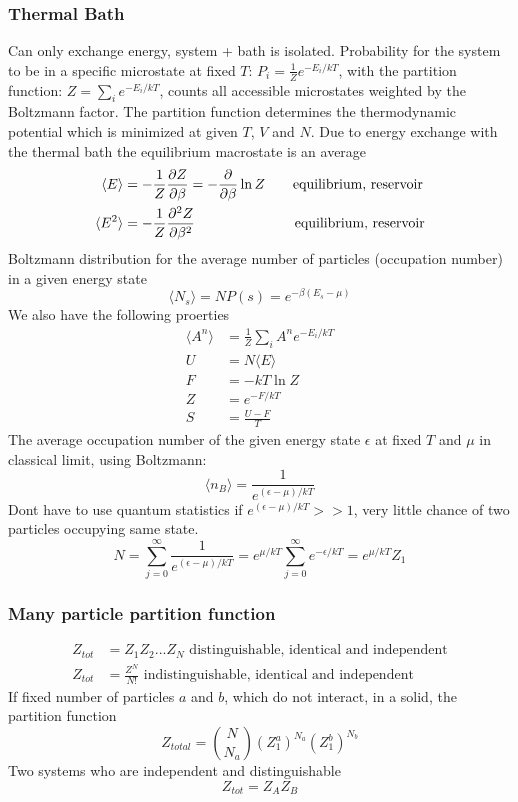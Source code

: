 \documentclass[a4paper, norsk, 8pt]{article}
\begin{document}
\begin{multicols*}{3}
\subsubsection*{\scriptsize Thermal Bath}
Can only exchange energy, system + bath is isolated. Probability for the system to be in a specific microstate at fixed $T$: $P_i = \frac{1}{Z}e^{-E_i/kT}$, with the partition function: $Z = \sum_{i} e^{-E_i/kT}$, counts all accessible microstates weighted by the Boltzmann factor. The partition function determines the thermodynamic potential which is minimized at given $T$, $V$ and $N$. Due to energy exchange with the thermal bath the equilibrium macrostate is an average
\begin{align*}
  \langle E \rangle &= -\frac{1}{Z}\pdv{Z}{\beta}  = -\pdv{}{\beta}\ln{Z}\qquad \text{equilibrium, reservoir}\\
  \langle E^2 \rangle &= -\frac{1}{Z}\pdv[2]{Z}{\beta}\quad \qquad \qquad \qquad \,\text{equilibrium, reservoir}
\end{align*}
Boltzmann distribution for the average number of particles (occupation number) in a given energy state
\begin{equation*}
  \langle N_s \rangle = NP(s) = e^{-\beta(E_s-\mu)}
\end{equation*}
We also have the following proerties
\begin{align*}
    \langle A^n \rangle &= \frac{1}{Z}\sum_{i} A^n e^{-E_i/kT} \\
    U &= N\langle E \rangle  \\
    F &= -kT\ln{Z} \\
    Z &= e^{-F/kT} \\
    S &= \frac{U-F}{T}
\end{align*}
The average occupation number of the given	energy state $\epsilon$ at fixed $T$ and $\mu$ in classical limit, using Boltzmann:
$$ \langle n_{B} \rangle = \frac{1}{e^{(\epsilon-\mu)/kT}}$$
Dont have to use quantum statistics if $e^{(\epsilon-\mu)/kT}>>1$, very little chance of two particles occupying same state.
$$ N = \sum_{j=0}^{\infty} \frac{1}{e^{(\epsilon-\mu)/kT}} = e^{\mu/kT}\sum_{j=0}^{\infty}e^{-\epsilon/kT} =e^{\mu/kT}Z_1 $$
\subsubsection*{\scriptsize Many particle partition function}
\begin{align*}
  Z_{tot} &= Z_1Z_2...Z_N\,\, \text{distinguishable, identical and independent}\\
  Z_{tot} &= \frac{Z^N}{N!}\,\, \text{indistinguishable, identical and independent }
\end{align*}
If fixed number of particles $a$ and $b$, which do not interact, in a solid, the partition function
\begin{equation*}
  Z_{total} = \binom{N}{N_a}(Z_1^a)^{N_a}(Z_1^b)^{N_b}
\end{equation*}
Two systems who are independent and distinguishable
$$Z_{tot} = Z_AZ_B $$

\end{multicols*}
\end{document}
